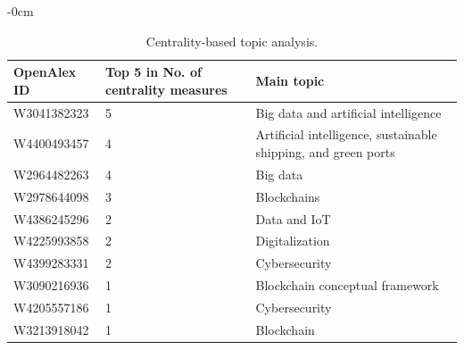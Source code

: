 \documentclass[jmse,review,submit,pdftex,moreauthors]{Definitions/mdpi}
\begin{document}
\begin{adjustwidth}{-\extralength}{0cm}
\begin{table}[H]
	\centering
	\caption{Centrality-based topic analysis.}
	\begin{tabularx}{\linewidth}{XXX}
		\hline
		OpenAlex ID & Top 5 in No. of centrality measures & Main topic \\
		\hline
		W3041382323	& 5 & Big data and artificial intelligence\\
		W4400493457	& 4 & Artificial intelligence, sustainable shipping, and green ports\\
		W2964482263	& 4 & Big data\\
		W2978644098	& 3 & Blockchains\\
		W4386245296	& 2 & Data and IoT\\
		W4225993858	& 2 & Digitalization\\
		W4399283331	& 2 & Cybersecurity\\
		W3090216936	& 1 & Blockchain conceptual framework\\
		W4205557186	& 1 & Cybersecurity\\
		W3213918042	& 1 & Blockchain\\
		\hline
	\end{tabularx}
	\label{tab:citationcentrality}
\end{table}


\end{adjustwidth}
\end{document}
